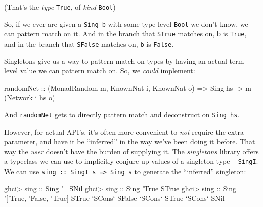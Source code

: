 \documentclass[]{article}
\newenvironment{Shaded}{}{}
\newcommand{\DataTypeTok}[1]{\textcolor[rgb]{0.56,0.13,0.00}{#1}}
\newcommand{\CharTok}[1]{\textcolor[rgb]{0.25,0.44,0.63}{#1}}
\newcommand{\OtherTok}[1]{\textcolor[rgb]{0.00,0.44,0.13}{#1}}
\newcommand{\FunctionTok}[1]{\textcolor[rgb]{0.02,0.16,0.49}{#1}}
\newcommand{\NormalTok}[1]{#1}
\begin{document}
(That's the \emph{type} \texttt{\textquotesingle{}True}, of \emph{kind}
\texttt{Bool})

So, if we ever are given a \texttt{Sing\ b} with some type-level \texttt{Bool}
we don't know, we can pattern match on it. And in the branch that \texttt{STrue}
matches on, \texttt{b} is \texttt{\textquotesingle{}True}, and in the branch
that \texttt{SFalse} matches on, \texttt{b} is \texttt{False}.

Singletons give us a way to pattern match on types by having an actual
term-level value we can pattern match on. So, we \emph{could} implement:

\begin{Shaded}
\begin{Highlighting}[]
\OtherTok{randomNet ::}\NormalTok{ (}\DataTypeTok{MonadRandom}\NormalTok{ m, }\DataTypeTok{KnownNat}\NormalTok{ i, }\DataTypeTok{KnownNat}\NormalTok{ o)}
          \OtherTok{=>} \DataTypeTok{Sing}\NormalTok{ hs }\OtherTok{->}\NormalTok{ m (}\DataTypeTok{Network}\NormalTok{ i hs o)}
\end{Highlighting}
\end{Shaded}

And \texttt{randomNet} gets to directly pattern match and deconstruct on
\texttt{Sing\ hs}.

However, for actual API's, it's often more convenient to \emph{not} require the
extra parameter, and have it be ``inferred'' in the way we've been doing it
before. That way the \emph{user} doesn't have the burden of supplying it. The
\emph{singletons} library offers a typeclass we can use to implicitly conjure up
values of a singleton type -- \texttt{SingI}. We can use
\texttt{sing\ ::\ SingI\ s\ =\textgreater{}\ Sing\ s} to generate the
``inferred'' singleton:

\begin{Shaded}
\begin{Highlighting}[]
\NormalTok{ghci}\FunctionTok{>}\OtherTok{ sing ::} \DataTypeTok{Sing} \CharTok{'[]}
\DataTypeTok{SNil}
\NormalTok{ghci}\FunctionTok{>}\OtherTok{ sing ::} \DataTypeTok{Sing} \CharTok{'True}
\DataTypeTok{STrue}
\NormalTok{ghci}\FunctionTok{>}\OtherTok{ sing ::} \DataTypeTok{Sing} \CharTok{'['}\DataTypeTok{True}\NormalTok{, }\CharTok{'False, '}\DataTypeTok{True}\NormalTok{]}
\DataTypeTok{STrue} \OtherTok{`SCons`} \DataTypeTok{SFalse} \OtherTok{`SCons`} \DataTypeTok{STrue} \OtherTok{`SCons`} \DataTypeTok{SNil}
\end{Highlighting}
\end{Shaded}
\end{document}
